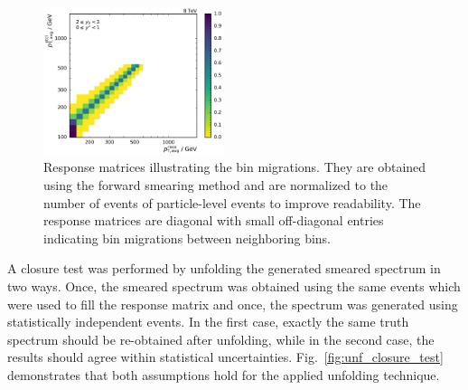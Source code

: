 \begin{figure}[htp]
    \includegraphics[width=0.47\textwidth]{figures/measurement/res_matrix_ptavg_normalized_yb2ys0.pdf}
    \caption[Response matrix used for the unfolding]{Response matrices
        illustrating the bin migrations. They are obtained using the forward smearing method and are normalized
        to the number of events of particle-level events to improve readability. The response
        matrices are diagonal with small off-diagonal entries indicating bin
    migrations between neighboring \ptavg bins.}
    \label{fig:res_matrix}
\end{figure}

A closure test was performed by unfolding the generated smeared spectrum in two
ways. Once, the smeared spectrum was obtained using the same events which were
used to fill the response matrix and once, the spectrum was generated using
statistically independent events. In the first case, exactly the same truth
spectrum should be re-obtained after unfolding, while in the second case, the
results should agree within statistical uncertainties.
Fig.~\ref{fig:unf_closure_test} demonstrates that both assumptions hold for the
applied unfolding technique.

